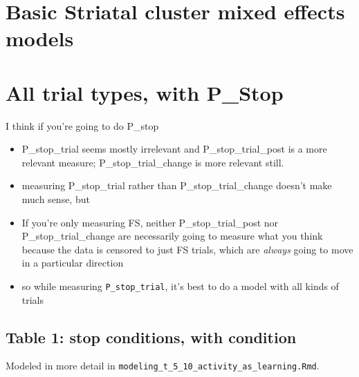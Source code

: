 \documentclass[
]{article}
\newenvironment{Shaded}{\begin{snugshade}}{\end{snugshade}}
\newcommand{\DecValTok}[1]{\textcolor[rgb]{0.00,0.00,0.81}{#1}}
\newcommand{\KeywordTok}[1]{\textcolor[rgb]{0.13,0.29,0.53}{\textbf{#1}}}
\newcommand{\NormalTok}[1]{#1}
\newcommand{\OperatorTok}[1]{\textcolor[rgb]{0.81,0.36,0.00}{\textbf{#1}}}
\newcommand{\StringTok}[1]{\textcolor[rgb]{0.31,0.60,0.02}{#1}}
\providecommand{\tightlist}{%
  \setlength{\itemsep}{0pt}\setlength{\parskip}{0pt}}
\begin{document}
\hypertarget{basic-striatal-cluster-mixed-effects-models}{%
\section{Basic Striatal cluster mixed effects
models}\label{basic-striatal-cluster-mixed-effects-models}}

\hypertarget{all-trial-types-with-p_stop}{%
\section{All trial types, with
P\_Stop}\label{all-trial-types-with-p_stop}}

I think if you're going to do P\_stop

\begin{itemize}
\tightlist
\item
  P\_stop\_trial seems mostly irrelevant and P\_stop\_trial\_post is a
  more relevant measure; P\_stop\_trial\_change is more relevant still.
\item
  measuring P\_stop\_trial rather than P\_stop\_trial\_change doesn't
  make much sense, but
\item
  If you're only measuring FS, neither P\_stop\_trial\_post nor
  P\_stop\_trial\_change are necessarily going to measure what you think
  because the data is censored to just FS trials, which are
  \emph{always} going to move in a particular direction
\item
  so while measuring \texttt{P\_stop\_trial}, it's best to do a model
  with all kinds of trials
\end{itemize}

\hypertarget{table-1-stop-conditions-with-condition}{%
\subsection{Table 1: stop conditions, with
condition}\label{table-1-stop-conditions-with-condition}}

Modeled in more detail in
\texttt{modeling\_t\_5\_10\_activity\_as\_learning.Rmd}.

\begin{Shaded}
\end{Shaded}
\end{document}
